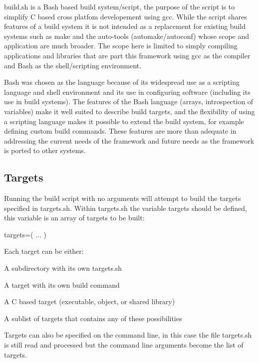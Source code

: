 {\ttfamily build.\+sh} is a Bash based build system/script, the purpose of the script is to simplify C based cross platfom developement using gcc. While the script shares features of a build system it is not intended as a replacement for existing build systems such as {\ttfamily make} and the \textquotesingle{}auto\textquotesingle{}-\/tools ({\ttfamily automake}/{\ttfamily autoconf}) whose scope and application are much broader. The scope here is limited to simply compiling applications and libraries that are part this framework using gcc as the compiler and Bash as the shell/scripting environment.

Bash was chosen as the language because of it\textquotesingle{}s widespread use as a scripting language and shell environment and it\textquotesingle{}s use in configuring software (including its use in build systems). The features of the Bash language (arrays, introspection of variables) make it well suited to describe build targets, and the flexibility of using a scripting language makes it possible to extend the build system, for example defining custom build commands. These features are more than adequate in addressing the current needs of the framework and future needs as the framework is ported to other systems.

\subsection*{Targets }

Running the build script with no arguments will attempt to build the targets specified in {\ttfamily targets.\+sh}. Within {\ttfamily targets.\+sh} the variable {\ttfamily targets} should be defined, this variable is an array of targets to be built\+: \begin{DoxyVerb}targets=( ... )
\end{DoxyVerb}


Each target can be either\+:


\begin{DoxyItemize}
\item A subdirectory with its own {\ttfamily targets.\+sh}
\item A target with it\textquotesingle{}s own build command
\item A C based target (executable, object, or shared library)
\item A sublist of targets that contains any of these possibilities
\end{DoxyItemize}

Targets can also be specified on the command line, in this case the file {\ttfamily targets.\+sh} is still read and processed but the command line arguments become the list of targets.

